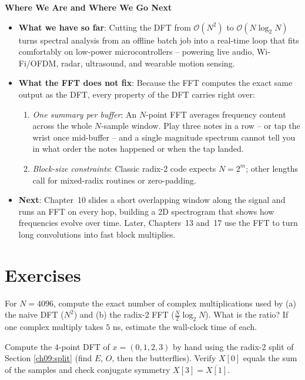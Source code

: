 \begin{connectionbox}
\textbf{Where We Are and Where We Go Next}
\begin{itemize}
  \item \textbf{What we have so far}: Cutting the DFT from $\mathcal{O}(N^2)$ to
  $\mathcal{O}(N\log_2 N)$ turns spectral analysis from an offline batch job into a real-time loop
  that fits comfortably on low-power microcontrollers -- powering live audio, Wi-Fi/OFDM, radar,
  ultrasound, and wearable motion sensing.
  \item \textbf{What the FFT does not fix}: Because the FFT computes the exact same output as the
  DFT, every property of the DFT carries right over:
  \begin{enumerate}
    \item \emph{One summary per buffer}: An $N$-point FFT averages frequency content across the
    whole $N$-sample window. Play three notes in a row -- or tap the wrist once mid-buffer -- and a
    single magnitude spectrum cannot tell you in what order the notes happened or when the tap landed.
    \item \emph{Block-size constraints}: Classic radix-2 code expects $N = 2^m$; other lengths call
    for mixed-radix routines or zero-padding.
  \end{enumerate}
  \item \textbf{Next}: Chapter~10 slides a short overlapping window along the signal and runs an FFT
  on every hop, building a 2D spectrogram that shows how frequencies evolve over time. Later,
  Chapters~13 and~17 use the FFT to turn long convolutions into fast block multiplies.
\end{itemize}
\end{connectionbox}

\section{Exercises}
\label{ch09:exercises}

\begin{exercise}
\label{ch09:ex-count}
For $N = 4096$, compute the exact number of complex multiplications used by (a) the naive
DFT ($N^2$) and (b) the radix-2 FFT ($\tfrac{N}{2}\log_2 N$). What is the ratio? If one
complex multiply takes $5$ ns, estimate the wall-clock time of each.
\end{exercise}

\begin{exercise}
\label{ch09:ex-byhand}
Compute the $4$-point DFT of $x = (0,1,2,3)$ by hand using the radix-2 split of Section
\ref{ch09:split} (find $E$, $O$, then the butterflies). Verify $X[0]$ equals the sum of
the samples and check conjugate symmetry $X[3]=\overline{X[1]}$.
\end{exercise}

